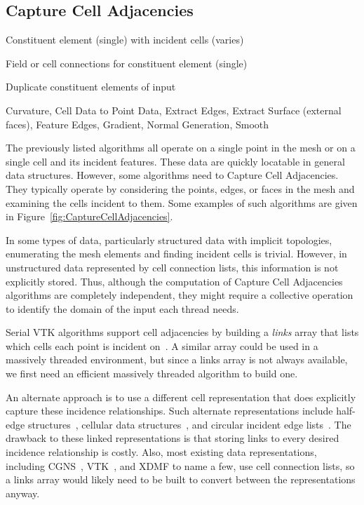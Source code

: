 \documentclass{sig-alternate}
\newcommand*{\lcite}[1]{~\cite{#1}}
\newcommand*{\keyterm}[1]{\emph{#1}}
\newcommand{\algclass}[1]{\textsf{#1}}
\newcommand{\algorithmclasssection}[1]{\subsection*{#1}}
\newcommand{\algorithmclass}[5]{
  \algorithmclasssection{#1} %
  \begin{description}[leftmargin=9em,style=nextline,noitemsep]
    \raggedright
  \item[Input] #2
  \item[Output] #3
  \item[Interdependence] #4
  \item[Algorithms] #5
  \end{description}
}
\begin{document}
\algorithmclass{Capture Cell Adjacencies}
               {Constituent element (single) with incident cells (varies)} %
               {Field or cell connections for constituent element (single)} %
               {Duplicate constituent elements of input} %
               {
                 Curvature,
                 Cell Data to Point Data,
                 Extract Edges,
                 Extract Surface (external faces),
                 Feature Edges,
                 Gradient,
                 Normal Generation,
                 Smooth
               }

\noindent
The previously listed algorithms all operate on a single point in the mesh
or on a single cell and its incident features. These data are quickly
locatable in general data structures. However, some algorithms need to
\algclass{Capture Cell Adjacencies}. They typically operate by considering
the points, edges, or faces in the mesh and examining the cells incident to
them. Some examples of such algorithms are given in
Figure~\ref{fig:CaptureCellAdjacencies}.

In some types of data, particularly structured data with implicit
topologies, enumerating the mesh elements and finding incident cells is
trivial. However, in unstructured data represented by cell connection
lists, this information is not explicitly stored. Thus, although the
computation of \algclass{Capture Cell Adjacencies} algorithms are
completely independent, they might require a collective operation to
identify the domain of the input each thread needs.

Serial VTK algorithms support cell adjacencies by building a
\keyterm{links} array that lists which cells each point is incident
on\lcite{VTKUsersGuide}. A similar array could be used in a massively
threaded environment, but since a links array is not always available, we
first need an efficient massively threaded algorithm to build one.

An alternate approach is to use a different cell representation that does
explicitly capture these incidence relationships. Such alternate
representations include half-edge structures\lcite{Kettner1998}, cellular
data structures\lcite{Alumbaugh2005}, and circular incident edge
lists\lcite{Levy2001}. The drawback to these linked representations is that
storing links to every desired incidence relationship is costly. Also, most
existing data representations, including CGNS\lcite{CGNS}, VTK\lcite{VTK},
and XDMF to name a few, use cell connection lists, so a links array would
likely need to be built to convert between the representations anyway.
\end{document}
